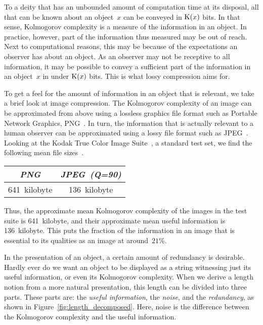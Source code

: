 \label{sec:statistics}%

To a deity that has an unbounded amount of computation time at its disposal, all that can be known about an object~$x$ can be conveyed in $\operatorname{K}(x)$ bits.
In that sense, Kolmogorov complexity is a measure of the information in an object.
In practice, however, part of the information thus measured may be out of reach.
Next to computational reasons, this may be because of the expectations an observer has about an object.
As an observer may not be receptive to all information, it may be possible to convey a sufficient part of the information in an object~$x$ in under $\operatorname{K}(x)$ bits.
This is what lossy compression aims for.

\begin{example}
\label{ex:useful_information}%
  To get a feel for the amount of information in an object that is relevant, we take a brief look at image compression.
  The Kolmogorov complexity of an image can be approximated from above using a lossless graphics file format such as Portable Network Graphics, PNG~\parencite{sayood2017introduction}.
  In turn, the information that is actually relevant to a human observer can be approximated using a lossy file format such as JPEG~\parencite{sayood2017introduction}.
  Looking at the Kodak True Color Image Suite~\parencite{franzen1999kodak}, a standard test set, we find the following mean file sizes~\parencite{sneyers2016flif}.
  \begin{center}
    \begin{tabular}{cc}
    \emph{PNG}	& \emph{JPEG~(Q=90)} \\
    \hline
    641~kilobyte	& 136~kilobyte
    \end{tabular}
  \end{center}
  Thus, the approximate mean Kolmogorov complexity of the images in the test suite is 641~kilobyte, and their approximate mean useful information is 136~kilobyte.
  This puts the fraction of the information in an image that is essential to its qualities as an image at around~$21\%$.
\end{example}

In the presentation of an object, a certain amount of redundancy is desirable.
Hardly ever do we want an object to be displayed as a string witnessing just its useful information, or even its Kolmogorov complexity.
When we derive a length notion from a more natural presentation, this length can be divided into three parts.
These parts are: the \emph{useful information}, the \emph{noise}, and the \emph{redundancy}, as shown in Figure~\ref{fig:length_decomposed}.
Here, noise is the difference between the Kolmogorov complexity and the useful information.

